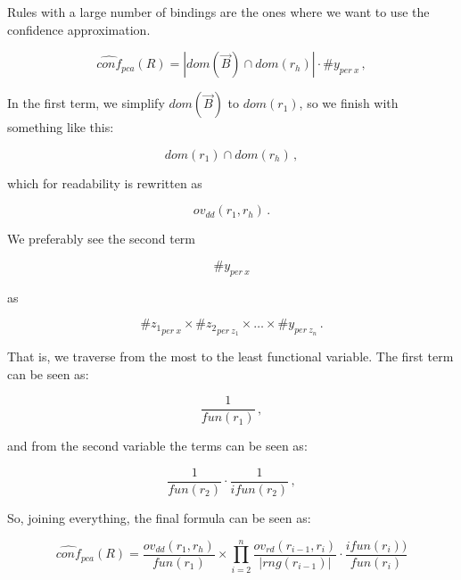 \documentclass{article}
\newcommand{\body}{\vec{B}}
\begin{document}
Rules with a large number of bindings are the ones where we want to use the
confidence approximation.

\begin{equation}
    \label{eq:approx_stand_conf}
    \widehat{conf}_{pca}(R) = | dom(\body) \cap dom(r_h) | \cdot \# y_{per\ x}\,,
\end{equation}

In the first term, we simplify $dom(\body)$ to $dom(r_1)$, so we finish with
something like this:

\begin{equation*}
    dom(r_1) \cap dom(r_h)\,,
\end{equation*}

\noindent which for readability is rewritten as

\begin{equation*}
    ov_{dd}(r_1, r_h)\,.
\end{equation*}

\noindent We preferably see the second term

\begin{equation*}
    \#y_{per\ x}
\end{equation*}

\noindent as

\begin{equation*}
    \#{z_1}_{per\ x} \times \#{z_2}_{per\ z_1} \times \ldots \times \#y_{per\ z_n}\,.
\end{equation*}

\noindent That is, we traverse from the most to the least functional variable.
The first term can be seen as:

\begin{equation*}
    \dfrac{1}{fun(r_1)}\,,
\end{equation*}

\noindent and from the second variable the terms can be seen as:

\begin{equation*}
    \dfrac{1}{fun(r_2)} \cdot \dfrac{1}{ifun(r_2)} \,,
\end{equation*}

So, joining everything, the final formula can be seen as:

\begin{equation}
    \label{eq:approx_stand_conf_general}
    \widehat{conf}_{pca}(R) = \dfrac{ov_{dd}(r_1, r_h)}{fun(r_1)}
    \times
    \prod_{i=2}^{n} \dfrac{ov_{rd}(r_{i-1}, r_i)}{|rng(r_{i-1})|} \cdot \dfrac{ifun(r_i))}{fun(r_i)}
\end{equation}



\end{document}
